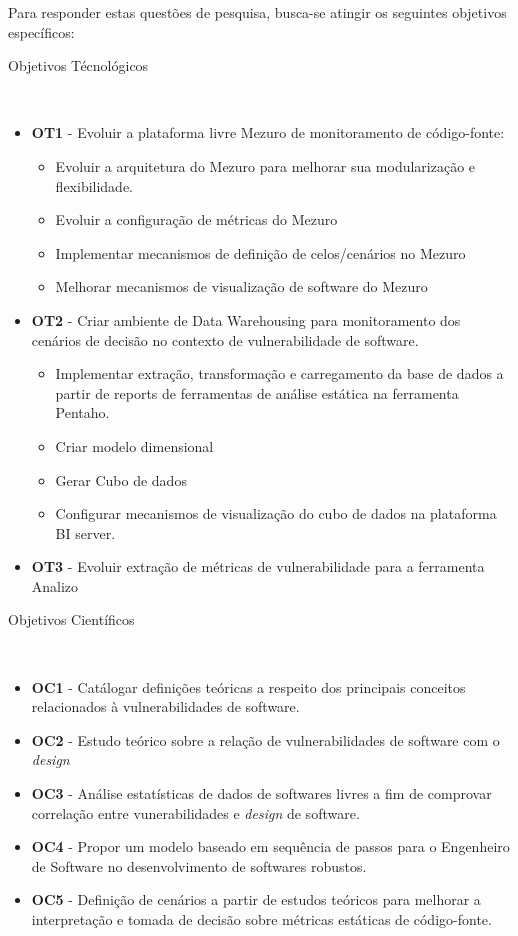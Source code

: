 %

Para responder estas questões de pesquisa, busca-se atingir os seguintes objetivos específicos:

%
\begin{description}
	\item [Objetivos Técnológicos]\
\end{description}
		\begin{itemize}
			\item \textbf{OT1} - Evoluir a plataforma livre Mezuro de monitoramento de código-fonte:
				\begin{itemize}
					\item Evoluir a arquitetura do Mezuro para melhorar sua modularização e flexibilidade.
					\item Evoluir a configuração de métricas do Mezuro
					\item Implementar mecanismos de definição de celos/cenários no Mezuro
					\item Melhorar mecanismos de visualização de software do Mezuro
				\end{itemize}
			\item \textbf{OT2} - Criar ambiente de Data Warehousing para monitoramento dos cenários de decisão no contexto de vulnerabilidade de software.	
	        	\begin{itemize}
	        		\item Implementar extração, transformação e carregamento da base de dados a partir de reports de ferramentas de análise estática na ferramenta Pentaho.
	        		\item Criar modelo dimensional
	        		\item Gerar Cubo de dados        
					\item Configurar mecanismos de visualização do cubo de dados na plataforma BI server.
	        	\end{itemize}
			\item \textbf{OT3} - Evoluir extração de métricas de vulnerabilidade para a ferramenta Analizo
		\end{itemize}
\begin{description}
	\item [Objetivos Científicos]\
\end{description}	
	 	\begin{itemize}
			\item \textbf{OC1} - Catálogar definições teóricas a respeito dos principais conceitos relacionados à vulnerabilidades de software.
			\item \textbf{OC2} - Estudo teórico sobre a relação de vulnerabilidades de software com o \emph{design}
			\item \textbf{OC3} - Análise estatísticas de dados de softwares livres a fim de comprovar correlação entre vunerabilidades e \emph{design} de software.
			\item \textbf{OC4} - Propor um modelo baseado em sequência de passos para o Engenheiro de Software no desenvolvimento de softwares robustos.
			\item \textbf{OC5} - Definição de cenários a partir de estudos teóricos para melhorar a interpretação e tomada de decisão sobre métricas estáticas de código-fonte.
	 	\end{itemize}
